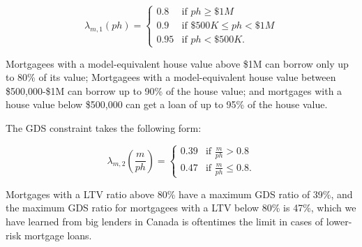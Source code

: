\documentclass[parskip=full]{article}
\begin{document}
\begin{equation*}
\lambda_{m,1}(ph) = \begin{cases}
0.8 &\text{if $ph\geq \$1M$}\\
0.9 &\text{if $\$500K\leq ph< \$1M$}\\
0.95 &\text{if $ph < \$500K$}.
\end{cases}
\end{equation*}

\noindent Mortgagees with a model-equivalent house value above \$1M can borrow only up to 80\% of its value; Mortgagees with a model-equivalent house value between \$500,000-\$1M can borrow up to 90\% of the house value; and mortgages with a house value below \$500,000 can get a loan of up to 95\% of the house value. 

The GDS constraint takes the following form:

\begin{equation*}
\lambda_{m,2}\left(\frac{m}{ph}\right) = \begin{cases}
0.39 &\text{if $\frac{m}{ph}>0.8$}\\
0.47 &\text{if $\frac{m}{ph}\leq 0.8$}.
\end{cases}
\end{equation*}

\noindent Mortgages with a LTV ratio above 80\% have a maximum GDS ratio of 39\%, and the maximum GDS ratio for mortgagees with a LTV below 80\% is 47\%, which we have learned from big lenders in Canada is oftentimes the limit in cases of lower-risk mortgage loans. 
\end{document}
